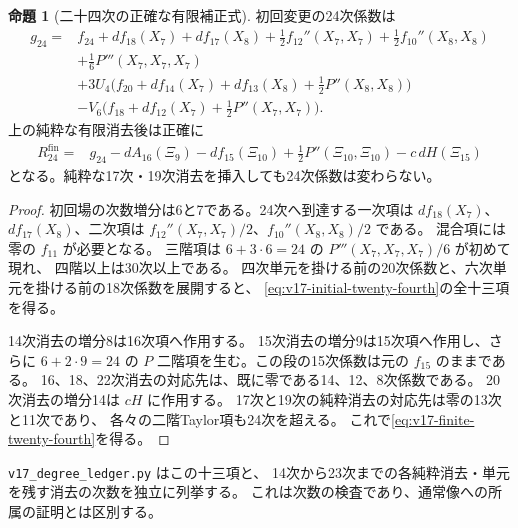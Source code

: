 \documentclass[a4paper,11pt]{ltjsarticle}
\theoremstyle{definition}
\newtheorem{proposition}[theorem]{命題}
\begin{document}
\begin{proposition}[二十四次の正確な有限補正式]
\label{prop:v17-exact-twenty-fourth-correction}
初回変更の24次係数は
\begin{equation}\label{eq:v17-initial-twenty-fourth}
\begin{split}
 g_{24}={}&f_{24}+df_{18}(X_7)+df_{17}(X_8)
       +\tfrac12 f_{12}''(X_7,X_7)+\tfrac12 f_{10}''(X_8,X_8)\\
 &+\tfrac16P'''(X_7,X_7,X_7)\\
 &+3U_4\bigl(f_{20}+df_{14}(X_7)+df_{13}(X_8)
                         +\tfrac12P''(X_8,X_8)\bigr)\\
 &-V_6\bigl(f_{18}+df_{12}(X_7)+\tfrac12P''(X_7,X_7)\bigr).
\end{split}
\end{equation}
上の純粋な有限消去後は正確に
\begin{equation}\label{eq:v17-finite-twenty-fourth}
\begin{split}
 R_{24}^{\mathrm{fin}}={}&g_{24}-dA_{16}(\Xi_9)-df_{15}(\Xi_{10})
                  +\tfrac12P''(\Xi_{10},\Xi_{10})
                  -c\,dH(\Xi_{15})
\end{split}
\end{equation}
となる。純粋な17次・19次消去を挿入しても24次係数は変わらない。
\end{proposition}

\begin{proof}
初回場の次数増分は6と7である。24次へ到達する一次項は
$df_{18}(X_7)$、$df_{17}(X_8)$、二次項は
$f_{12}''(X_7,X_7)/2$、$f_{10}''(X_8,X_8)/2$ である。
混合項には零の $f_{11}$ が必要となる。
三階項は $6+3\cdot6=24$ の $P'''(X_7,X_7,X_7)/6$ が初めて現れ、
四階以上は30次以上である。
四次単元を掛ける前の20次係数と、六次単元を掛ける前の18次係数を展開すると、
\eqref{eq:v17-initial-twenty-fourth}の全十三項を得る。

14次消去の増分8は16次項へ作用する。
15次消去の増分9は15次項へ作用し、さらに $6+2\cdot9=24$ の
$P$ 二階項を生む。この段の15次係数は元の $f_{15}$ のままである。
16、18、22次消去の対応先は、既に零である14、12、8次係数である。
20次消去の増分14は $cH$ に作用する。
17次と19次の純粋消去の対応先は零の13次と11次であり、
各々の二階Taylor項も24次を超える。
これで\eqref{eq:v17-finite-twenty-fourth}を得る。
\end{proof}

\nolinkurl{v17_degree_ledger.py} はこの十三項と、
14次から23次までの各純粋消去・単元を残す消去の次数を独立に列挙する。
これは次数の検査であり、通常像への所属の証明とは区別する。
\end{document}
